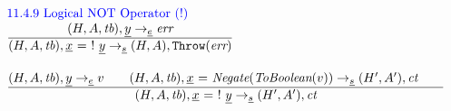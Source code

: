 \documentclass[a4paper, leqno]{amsart}
\newcommand{\rulesep}{\quad\quad}
\newcommand{\stmt}{s}
\newcommand{\expr}{e}
\newcommand{\ir}[1]{\ensuremath{\underline{#1}}}
\newcommand{\irid}{\ir{x}}
\def\inblue{\color{blue}}
\newcommand{\tb}{\emph{tb}}
\newcommand{\err}{\emph{err}}
\newcommand{\ct}{\emph{ct}}
\newcommand{\hf}[1]{\emph{#1}}
\newcommand{\error}{\ensuremath{{\tt Throw}(\err)}}
\newcommand{\state}{\ensuremath{(H,A,\tb)}}
\newcommand{\res}{\ensuremath{(H,A)}}
\newcommand{\resp}{\ensuremath{(H',A')}}
\newcommand{\evale}{\ensuremath{(H,A,\tb)}}
\def\inblue{\color{blue}}
\begin{document}
\[\begin{array}{l@{~~}l@{~~}ll}
\mbox{\inblue 11.4.9 Logical NOT Operator ($!$)}\\
\frac{\begin{matrix}
\evale, \ir{y} \rightarrow_{\ir\expr} \err
\end{matrix}}{\begin{matrix}
\state, \irid \ {\tt =} \ {\tt !}\ \ir{y}
\rightarrow_{\ir\stmt}
\res, \error
\end{matrix}}
\\[2em]

\frac{\begin{matrix}
\evale, \ir{y} \rightarrow_{\ir\expr} v
\rulesep
\state, \irid \ {\tt =} \ \hf{Negate}(\hf{ToBoolean}(v)) \rightarrow_{\ir\stmt} \resp, \ct
\rulesep
\end{matrix}}{\begin{matrix}
\state, \irid \ {\tt =} \ {\tt !}\ \ir{y}
\rightarrow_{\ir\stmt}
\resp, \ct
\end{matrix}}
\\[2em]
\end{array}
\]
\end{document}
